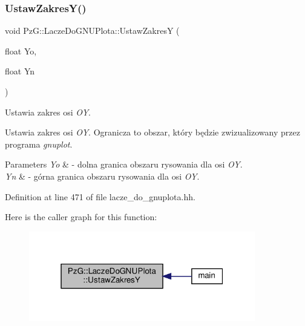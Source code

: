 \subsubsection{\texorpdfstring{Ustaw\+Zakres\+Y()}{UstawZakresY()}}
{\footnotesize\ttfamily void Pz\+G\+::\+Lacze\+Do\+G\+N\+U\+Plota\+::\+Ustaw\+ZakresY (\begin{DoxyParamCaption}\item[{float}]{Yo,  }\item[{float}]{Yn }\end{DoxyParamCaption})\hspace{0.3cm}{\ttfamily [inline]}}



Ustawia zakres osi {\itshape OY}. 

Ustawia zakres osi {\itshape OY}. Ogranicza to obszar, który będzie zwizualizowany przez programa {\itshape gnuplot}. 
\begin{DoxyParams}{Parameters}
{\em Yo} & -\/ dolna granica obszaru rysowania dla osi {\itshape OY}. \\
\hline
{\em Yn} & -\/ górna granica obszaru rysowania dla osi {\itshape OY}. \\
\hline
\end{DoxyParams}


Definition at line 471 of file lacze\+\_\+do\+\_\+gnuplota.\+hh.

Here is the caller graph for this function\+:\nopagebreak
\begin{figure}[H]
\begin{center}
\leavevmode
\includegraphics[width=280pt]{class_pz_g_1_1_lacze_do_g_n_u_plota_a54c6e9cf9ab2eae479451fd953c2717c_icgraph}
\end{center}
\end{figure}
\mbox{\label{class_pz_g_1_1_lacze_do_g_n_u_plota_a1dbbb2b86fb13b8632e6bad9df2a82e3}} 
